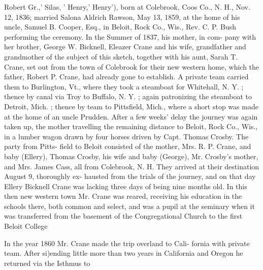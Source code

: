 \documentclass{book}
\begin{document}
Robert Gr.,' Silas, ' Henry,' Henry'), born at Colebrook, Coos 
Co., N. H., Nov. 12, 1836; married Salona Aldrich Rawson, 
May 13, 1859, at the home of his uncle, Samuel B. Cooper, 
Esq., in Beloit, Rock Co., Wis., Rev. C. P. Bush performing 
the ceremony. In the Summer of 1837, his mother, in com- 
pany with her brother, George W. Bicknell, Eleazer Crane and 
his wife, grandfather and grandmother of the subject of this 
sketch, together with his aunt, Sarah T. Crane, set out from the 
town of Colebrook for their new western home, which the father, 
Robert P. Crane, had already gone to establish. A private team 
carried them to Burlington, Vt., where they took a steamboat for 
Whitehall, N. Y. ; thence by canal via Troy to Buffalo, N. Y. ; 
again patronizing the steamboat to Detroit, Mich. ; thence by 
team to Pittsfield, Mich., where a short stop was made at the 
home of an uncle Prudden. After a few weeks' delay the journey 
was again taken up, the mother travelling the remaining distance 
to Beloit, Rock Co., Wis., in a lumber wagon drawn by four 
horses driven by Capt. Thomas Crosby. The party from Pitts- 
field to Beloit consisted of the mother, Mrs. R. P. Crane, and 
baby (Ellery), Thomas Crosby, his wife and baby (George), Mr. 
Crosby's mother, and Mrs. James Cass, all from Colebrook, N. 
H. They arrived at their destination August 9, thoroughly ex- 
hausted from the trials of the journey, and on that day Ellery 
Bicknell Crane was lacking three days of being nine months old. 
In this then new western town Mr. Crane was reared, receiving 
his education in the schools there, both common and select, and 
was a pupil at the seminary when it was transferred from the 
basement of the Congregational Church to the first Beloit College 

In the year 1860 Mr. Crane made the trip overland to Cali- 
fornia with private team. After si)ending little more than two 
years in California and Oregon he returned via the Isthmus to 
\end{document}
